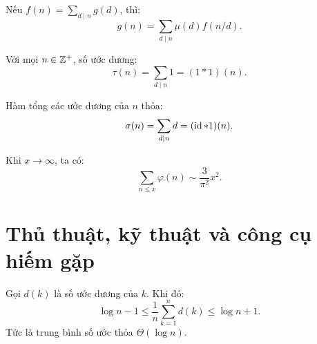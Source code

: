 \documentclass[../imo-training-open-book.tex]{subfiles}
\begin{document}
\vspace{1em}

\begin{theorem*}
    \label{theorem:mobius-inversion-arithmetic}
    Nếu \( f(n) = \sum_{d \mid n} g(d) \), thì:
    \[
        g(n) = \sum_{d \mid n} \mu(d) f(n/d).
    \]
\end{theorem*}

\vspace{1em}

\begin{theorem*}[\href{https://w.wiki/9WO3}{Đẳng thức \( \tau = 1 * 1 \)}]
    \label{theorem:tau-convolution}
    Với mọi \( n \in \mathbb Z^+ \), số ước dương:
    \[
        \tau(n) = \sum_{d \mid n} 1 = (1 * 1)(n).
    \]
\end{theorem*}

\vspace{1em}

\begin{theorem*}[\href{https://w.wiki/9WO4}{Đẳng thức \( \sigma = \id * 1 \)}]
    \label{theorem:sigma-convolution}
    Hàm tổng các ước dương của \( n \) thỏa:
    \[
        \sigma(n) = \sum_{d \mid n} d = (\operatorname{id} * 1)(n).
    \]
\end{theorem*}

\vspace{1em}

\begin{theorem*}
    \label{theorem:totient-sum-asymptotic}
    Khi \( x \to \infty \), ta có:
    \[
        \sum_{n \le x} \varphi(n) \sim \frac{3}{\pi^2}x^2.
    \]
\end{theorem*}

\newpage

\section{Thủ thuật, kỹ thuật và công cụ hiếm gặp}

\begin{theorem*}
    \label{theorem:average-tau}
    Gọi \( d(k) \) là số ước dương của \( k \). Khi đó:
    \[
        \log n - 1 \le \frac{1}{n} \sum_{k=1}^n d(k) \le \log n + 1.
    \]
    Tức là trung bình số ước thỏa \( \Theta(\log n) \).
\end{theorem*}

\vspace{1em}
\end{document}
